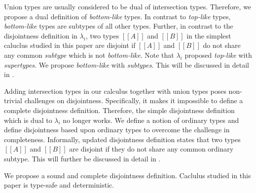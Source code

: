 Union types are usually considered to be dual of intersection types.
Therefore, we propose a dual definition of \emph{bottom-like} types.
In contrast to \emph{top-like} types, \emph{bottom-like} types are
subtypes of all other types. Further, in contrast to the disjointness
definition in $\lambda_{i}$, two types $[[A]]$ and $[[B]]$ in the simplest 
caluclus studied in this paper are disjoint if $[[A]]$ and $[[B]]$
do not share any common \emph{subtype} which is not \emph{bottom-like}.
Note that $\lambda_{i}$ proposed \emph{top-like} with \emph{supertypes}.
We propose \emph{bottom-like} with \emph{subtypes}. This will be discussed
in detail in .

Adding intersection types in our calculus
together with union types poses non-trivial challenges on disjointness.
Specifically, it makes it impossible to define a complete disjointness
definition. Therefore, the simple disjointness definition which is dual
to $\lambda_{i}$ no longer works. We define a notion of ordinary types
and define disjointness based upon ordinary types to overcome the
challenge in completeness. Informally, updated disjointness definition states
that two types $[[A]]$ and $[[B]]$ are disjoint if they do not share any
common ordinary subtype. This will further be discussed in detail in
.

We propose a sound and complete disjointness definition. Caclulus studied
in this paper is type-safe and deterministic.


